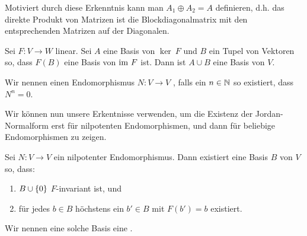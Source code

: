 \documentclass[10pt]{article}
\begin{document}
	\begin{definition}
		Motiviert durch diese Erkenntnis kann man $A_1 \oplus A_2 = A$ definieren, d.h. das direkte Produkt von Matrizen ist die Blockdiagonalmatrix mit den entsprechenden Matrizen auf der Diagonalen.
	\end{definition}
	\begin{exercise}
		\label{res:twobases}
		Sei $F : V \to W$ linear. Sei $A$ eine Basis von $\ker~ F$ und $B$ ein Tupel von Vektoren so, dass $F(B)$ eine Basis von $\textnormal{im}~ F$ ist. Dann ist $A \cup B$ eine Basis von $V$.
	\end{exercise}
	\begin{definition}
		Wir nennen einen Endomorphismus $N : V \to V$ , falls ein $n \in \mathbb{N}$ so existiert, dass $N^n = 0$.
	\end{definition}
	Wir können nun unsere Erkentnisse verwenden, um die Existenz der Jordan-Normalform erst für nilpotenten Endomorphismen, und dann für beliebige Endomorphismen zu zeigen.
	\begin{theorem}
		\label{res:jordanbasis}
		Sei $N : V \to V$ ein nilpotenter Endomorphismus. Dann existiert eine Basis $B$ von $V$ so, dass:
		\begin{enumerate}
			\item $B \cup \qty{0}$ $F$-invariant ist, und
			\item für jedes $b \in B$ höchstens ein $b' \in B$ mit $F(b') = b$ existiert.
		\end{enumerate}
		Wir nennen eine solche Basis eine .
	\end{theorem}
\end{document}
